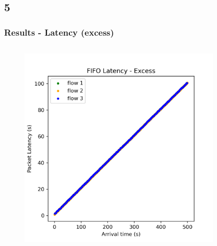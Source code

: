 \documentclass[compress]{beamer}
\begin{document}
    \subsection{5}
    \begin{frame}
        \frametitle{Results - Latency (excess)}
        \begin{columns}
            \begin{column}{0.32\textwidth}
                \begin{figure}
                    \centering
                    \includegraphics[width=\textwidth]{img/fifo_excess}
                \end{figure}
            \end{column}
            \begin{column}{0.32\textwidth}
                \begin{figure}
                    \centering

\end{figure}
\end{column}
\end{columns}
\end{frame}
\end{document}
